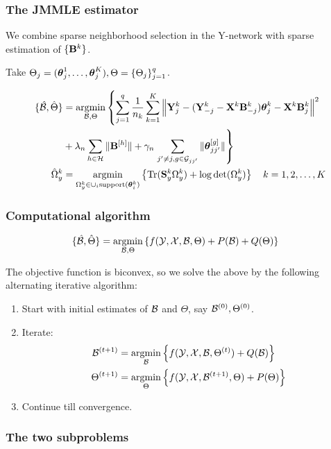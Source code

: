 \documentclass[10pt]{beamer}
\theoremstyle{definition}
\DeclareMathOperator*{\Tr}{Tr}
\DeclareMathOperator*{\argmin}{argmin}
\begin{document}
\begin{frame}
\frametitle{The JMMLE estimator}
We combine sparse neighborhood selection in the Y-network with sparse estimation of $\{ {\mathbf{B}}^k \}$.

Take $\Theta_j = ({\boldsymbol{\theta}}_j^1, \ldots, {\boldsymbol{\theta}}_j^K), \Theta = \{ \Theta_j \}_{j=1}^q$.

\begin{align*}
\{ \hat \cB, \hat \Theta \} &=
\argmin_{\cB, \Theta} \left\{ \sum_{j=1}^q \frac{1}{n_k} \sum_{k=1}^K
\left\| \bfY_j^k - ( \bfY_{-j}^k - \bfX^k \bfB_{-j}^k) \bftheta_j^k
- \bfX^k \bfB_j^k \right\|^2 \right.\\
& + \lambda_n \sum_{h \in \cH} \| \bfB^{[h]} \|
+ \gamma_n \left. \sum_{j' \neq j, g \in \cG_{jj'}} \| \bftheta_{jj'}^{[g]} \| \right\}\\
\hat \Omega_y^k &= \argmin_{\Omega_y^k \in \cup_i \text{support} (\bftheta_i^k)}
\left\{ \Tr (\bfS_y^k \Omega_y^k ) + \log \det (\Omega_y^k ) \right\}
\quad k = 1, 2, \ldots, K
\end{align*}
\end{frame}
\begin{frame}
\frametitle{Computational algorithm}
\begin{align*}
\{ \hat \cB, \hat \Theta \} &= \argmin_{\cB, \Theta}
\left\{ f(\cY, \cX, \cB, \Theta) + P(\cB) + Q(\Theta) \right\}
\end{align*}

The objective function is biconvex, so we solve the above by the following alternating iterative algorithm:

\begin{enumerate}
\item Start with initial estimates of ${\cal{B}}$ and $\Theta$, say ${\cal{B}}^{(0)}, \Theta^{(0)}$.
\item Iterate:
%
\begin{align*}
\cB^{(t+1)} &= \argmin_\cB \left\{ f ( \cY, \cX, \cB, \Theta^{(t)}) + Q (\cB) \right\}\\
\Theta^{(t+1)} &= \argmin_\Theta \left\{ f ( \cY, \cX, \cB^{(t+1)}, \Theta) + P (\Theta) \right\}
\end{align*}
\item Continue till convergence.
\end{enumerate}
\end{frame}

\begin{frame}
\frametitle{The two subproblems}

\end{frame}
\end{document}
